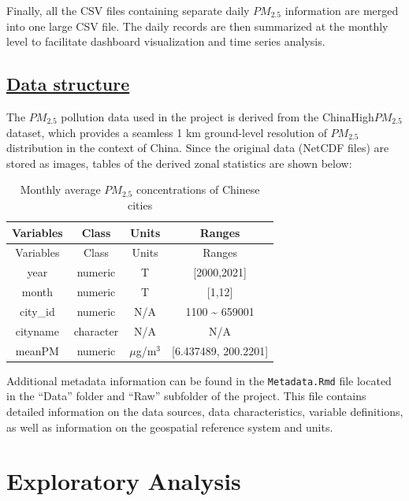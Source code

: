 \documentclass[
  12pt,
]{article}
\begin{document}
Finally, all the CSV files containing separate daily \(PM_{2.5}\)
information are merged into one large CSV file. The daily records are
then summarized at the monthly level to facilitate dashboard
visualization and time series analysis.

\hypertarget{data-structure}{%
\subsection{\texorpdfstring{\href{https://github.com/Artemis20123/FangLiRenZhang_ENV872_EDA_FinalProject/blob/main/Data/Raw/Metadata.Rmd}{Data
structure}}{Data structure}}\label{data-structure}}

The \(PM_{2.5}\) pollution data used in the project is derived from the
ChinaHigh\(PM_{2.5}\) dataset, which provides a seamless 1 km
ground-level resolution of \(PM_{2.5}\) distribution in the context of
China. Since the original data (NetCDF files) are stored as images,
tables of the derived zonal statistics are shown below:

\begin{longtable}[]{@{}cccc@{}}
\caption{Monthly average \(PM_{2.5}\) concentrations of Chinese
cities}\tabularnewline
\toprule()
Variables & Class & Units & Ranges \\
\midrule()
\endfirsthead
\toprule()
Variables & Class & Units & Ranges \\
\midrule()
\endhead
year & numeric & T & {[}2000,2021{]} \\
month & numeric & T & {[}1,12{]} \\
city\_id & numeric & N/A & 1100 \textasciitilde{} 659001 \\
cityname & character & N/A & N/A \\
meanPM & numeric & \(\mu\)g/m\(^3\) & {[}6.437489, 200.2201{]} \\
\bottomrule()
\end{longtable}

Additional metadata information can be found in the
\texttt{Metadata.Rmd} file located in the ``Data'' folder and ``Raw''
subfolder of the project. This file contains detailed information on the
data sources, data characteristics, variable definitions, as well as
information on the geospatial reference system and units.

\newpage

\hypertarget{exploratory-analysis}{%
\section{Exploratory Analysis}\label{exploratory-analysis}}
\end{document}
